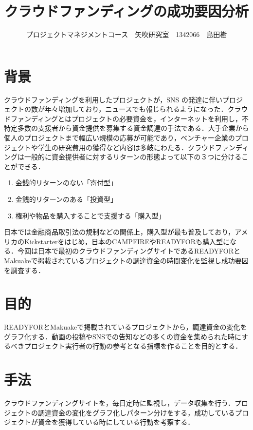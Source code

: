 \documentclass[uplatex,twocolumn,dvipdfmx]{jsarticle}
\title{\vspace{-5mm}\fontsize{14pt}{0pt}\selectfont クラウドファンディングの成功要因分析}
\author{\normalsize プロジェクトマネジメントコース　矢吹研究室　1342066　島田樹}
\date{}
\begin{document}
\fontsize{10.5pt}{\baselineskip}\selectfont
\maketitle





\section{背景}
クラウドファンディング\cite{wiki}を利用したプロジェクトが，SNS の発達に伴いプロジェクトの数が年々増加しており，ニュースでも報じられるようになった．クラウドファンディングとはプロジェクトの必要資金を，インターネットを利用し，不特定多数の支援者から資金提供を募集する資金調達の手法である．大手企業から個人のプロジェクトまで幅広い規模の応募が可能であり，ベンチャー企業のプロジェクトや学生の研究費用の獲得など内容は多岐にわたる．クラウドファンディングは一般的に資金提供者に対するリターンの形態よって以下の３つに分けることができる\cite{crwowd}．
\begin{enumerate}
 \item 金銭的リターンのない「寄付型」
 \item 金銭的リターンのある「投資型」
 \item 権利や物品を購入することで支援する「購入型」
\end{enumerate}

日本では金融商品取引法の規制などの関係上，購入型が最も普及しており\cite{keizai}，アメリカのKickstarterをはじめ，日本のCAMPFIREやREADYFORも購入型になる．今回は日本で最初のクラウドファンディングサイトであるREADYFORとMakuakeで掲載されているプロジェクトの調達資金の時間変化を監視し成功要因を調査する．


\section{目的}
READYFORとMakuakeで掲載されているプロジェクトから，調達資金の変化をグラフ化する．動画の投稿やSNSでの告知などの多くの資金を集められた時にするべきプロジェクト実行者の行動の参考となる指標を作ることを目的とする．


\section{手法}
クラウドファンディングサイトを，毎日定時に監視し，データ収集を行う．プロジェクトの調達資金の変化をグラフ化しパターン分けをする，成功しているプロジェクトが資金を獲得している時にしている行動を考察する．
\end{document}
